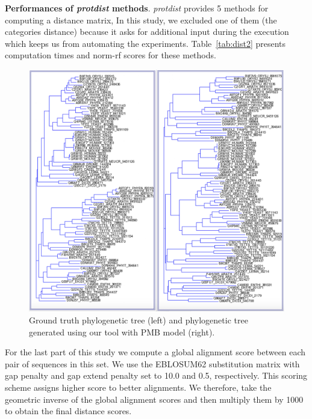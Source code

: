 \documentclass[11pt,letterpaper]{article}
\newcommand\kcomment[1]{\textcolor{blue}{#1 - Khanh}}
\theoremstyle{definition}
\begin{document}
\textbf{Performances of \textit{protdist} methods}. \textit{protdist} provides 5 methods for computing a distance matrix, In this study, we excluded one of them (the categories distance) because it asks for additional input during the execution which keeps us from automating the experiments. Table~\ref{tab:dist2} presents computation times and norm-rf scores for these methods.

\begin{figure}[h!]
  \centering
  \includegraphics[width=\textwidth]{gt-PMB.jpg}
  \caption{Ground truth phylogenetic tree (left) and phylogenetic tree generated using our tool with PMB model (right).}
  \label{fig:gt-PMB}
\end{figure}



For the last part of this study we compute a global alignment score between each pair of sequences in this set. We use the EBLOSUM62 substitution matrix with gap penalty and gap extend penalty set to 10.0 and 0.5, respectively. This scoring scheme assigns higher score to better alignments. We therefore, take the geometric inverse of the global alignment scores and then multiply them by 1000 to obtain the final distance scores.
\end{document}
